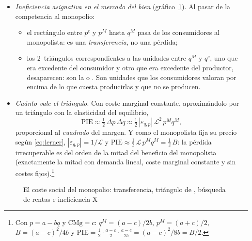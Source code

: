 \documentclass[11pt]{article}
\begin{document}
\begin{itemize}
\item \emph{Ineficiencia asignativa en el mercado del bien} (gráfico~\ref{fig:bienestar-monopolio}). Al pasar de la competencia al monopolio:
  \begin{itemize}
  \item el rectángulo entre $p^c$ y $p^M$ hasta $q^M$ pasa de los consumidores al monopolista: es una \emph{transferencia}, no una pérdida;
  \item los 2~triángulos correspondientes a las unidades entre $q^M$ y $q^c$, uno que era excedente del consumidor y otro que era excedente del productor, desaparecen: son la  o . Son unidades que los consumidores valoran por encima de lo que cuesta producirlas y que no se producen.
  \end{itemize}
\item \emph{Cuánto vale el triángulo}. Con coste marginal constante, aproximándolo por un triángulo con la elasticidad del equilibrio,
  \begin{equation}
  \mathrm{PIE}\approx\tfrac12\,\Delta p\,\Delta q\approx\tfrac12\,|\varepsilon_{q,p}|\,\mathcal{L}^2\,p^Mq^M, \label{eq:harberger}
  \end{equation}
  proporcional al \emph{cuadrado} del margen. Y como el monopolista fija su precio según \eqref{eq:lerner}, $|\varepsilon_{q,p}|=1/\mathcal{L}$ y $\mathrm{PIE}\approx\tfrac12\,\mathcal{L}\,p^Mq^M=\tfrac12\,B$: la pérdida irrecuperable es del orden de la mitad del beneficio del monopolista (exactamente la mitad con demanda lineal, coste marginal constante y sin costes fijos).\footnote{Con $p=a-bq$ y $\mathrm{CMg}=c$: $q^M=(a-c)/2b$, $p^M=(a+c)/2$, $B=(a-c)^2/4b$ y $\mathrm{PIE}=\frac{1}{2}\cdot\frac{a-c}{2}\cdot\frac{a-c}{2b}=(a-c)^2/8b=B/2$.}
\end{itemize}

\begin{figure}[H]
\centering
\caption{El coste social del monopolio: transferencia, triángulo de , búsqueda de rentas e ineficiencia X}\label{fig:bienestar-monopolio}
\end{figure}
\end{document}
